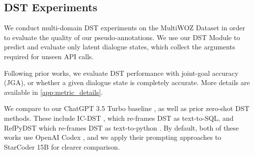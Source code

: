 \documentclass[11pt]{article}
\begin{document}
\subsection{DST Experiments}
\label{sec:expts-dst}

We conduct multi-domain DST experiments on the MultiWOZ Dataset in order to evaluate the quality of our pseudo-annotations. We use our DST Module to predict and evaluate only latent dialogue states, which collect the arguments required for unseen API calls.

Following prior works, we evaluate DST performance with joint-goal accuracy (JGA), or whether a given dialogue state is completely accurate. More details are available in \autoref{app:metric_details}.

We compare to our ChatGPT 3.5 Turbo baseline \cite{hudecek-dusek-2023-large}, as well as prior zero-shot DST methods.
These include IC-DST \cite{hu_-context_2022}, which re-frames DST as text-to-SQL, and RefPyDST which re-frames DST as text-to-python \cite{king-flanigan-2023-diverse}. By default, both of these works use OpenAI Codex \cite{chen_evaluating_2021}, and we apply their prompting approaches to StarCoder 15B for clearer comparison. 

\begin{table}[]
    \centering
    \caption{Joint Goal Accuracy (JGA) of our method's dialogue state predictions and zero-shot baselines}
    \label{tab:zero-shot-multi}
\end{table}
\end{document}
